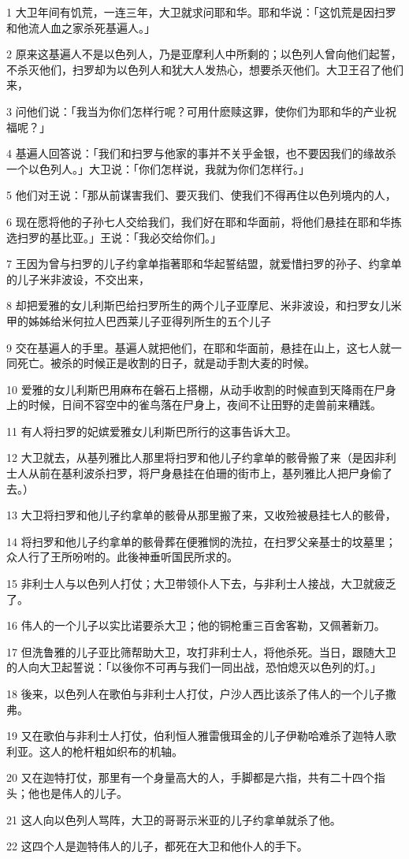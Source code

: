 \par 1 大卫年间有饥荒，一连三年，大卫就求问耶和华。耶和华说：「这饥荒是因扫罗和他流人血之家杀死基遍人。」
\par 2 原来这基遍人不是以色列人，乃是亚摩利人中所剩的；以色列人曾向他们起誓，不杀灭他们，扫罗却为以色列人和犹大人发热心，想要杀灭他们。大卫王召了他们来，
\par 3 问他们说：「我当为你们怎样行呢？可用什麽赎这罪，使你们为耶和华的产业祝福呢？」
\par 4 基遍人回答说：「我们和扫罗与他家的事并不关乎金银，也不要因我们的缘故杀一个以色列人。」大卫说：「你们怎样说，我就为你们怎样行。」
\par 5 他们对王说：「那从前谋害我们、要灭我们、使我们不得再住以色列境内的人，
\par 6 现在愿将他的子孙七人交给我们，我们好在耶和华面前，将他们悬挂在耶和华拣选扫罗的基比亚。」王说：「我必交给你们。」
\par 7 王因为曾与扫罗的儿子约拿单指著耶和华起誓结盟，就爱惜扫罗的孙子、约拿单的儿子米非波设，不交出来，
\par 8 却把爱雅的女儿利斯巴给扫罗所生的两个儿子亚摩尼、米非波设，和扫罗女儿米甲的姊姊给米何拉人巴西莱儿子亚得列所生的五个儿子
\par 9 交在基遍人的手里。基遍人就把他们，在耶和华面前，悬挂在山上，这七人就一同死亡。被杀的时候正是收割的日子，就是动手割大麦的时候。
\par 10 爱雅的女儿利斯巴用麻布在磐石上搭棚，从动手收割的时候直到天降雨在尸身上的时候，日间不容空中的雀鸟落在尸身上，夜间不让田野的走兽前来糟践。
\par 11 有人将扫罗的妃嫔爱雅女儿利斯巴所行的这事告诉大卫。
\par 12 大卫就去，从基列雅比人那里将扫罗和他儿子约拿单的骸骨搬了来（是因非利士人从前在基利波杀扫罗，将尸身悬挂在伯珊的街市上，基列雅比人把尸身偷了去。）
\par 13 大卫将扫罗和他儿子约拿单的骸骨从那里搬了来，又收殓被悬挂七人的骸骨，
\par 14 将扫罗和他儿子约拿单的骸骨葬在便雅悯的洗拉，在扫罗父亲基士的坟墓里；众人行了王所吩咐的。此後神垂听国民所求的。
\par 15 非利士人与以色列人打仗；大卫带领仆人下去，与非利士人接战，大卫就疲乏了。
\par 16 伟人的一个儿子以实比诺要杀大卫；他的铜枪重三百舍客勒，又佩著新刀。
\par 17 但洗鲁雅的儿子亚比筛帮助大卫，攻打非利士人，将他杀死。当日，跟随大卫的人向大卫起誓说：「以後你不可再与我们一同出战，恐怕熄灭以色列的灯。」
\par 18 後来，以色列人在歌伯与非利士人打仗，户沙人西比该杀了伟人的一个儿子撒弗。
\par 19 又在歌伯与非利士人打仗，伯利恒人雅雷俄珥金的儿子伊勒哈难杀了迦特人歌利亚。这人的枪杆粗如织布的机轴。
\par 20 又在迦特打仗，那里有一个身量高大的人，手脚都是六指，共有二十四个指头；他也是伟人的儿子。
\par 21 这人向以色列人骂阵，大卫的哥哥示米亚的儿子约拿单就杀了他。
\par 22 这四个人是迦特伟人的儿子，都死在大卫和他仆人的手下。

